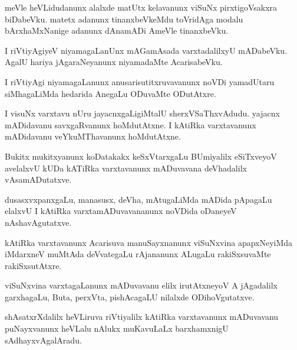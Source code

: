 \documentclass{article}
\begin{document}
\begin{mn}%
meVle heVLidudanunx alalxde matUtx kelavanunx viSuNx pirxtigoVsakxra biDabeVku. matetx adanunx 
tinanxbeVkeMdu toVridAga modalu bArxhaMxNanige adanunx dAnamADi AmeVle tinanxbeVku.
\end{mn}

\begin{mn}%
I riVtiyAgiyeV niyamagaLanUnx mAGamAsada varxtadalilxyU mADabeVku. AgalU hariya jAgaraNeyanunx 
niyamadaMte AcarisabeVku.
\end{mn}

\begin{mn}%
I riVtiyAgi niyamagaLanunx anusarisutitxruvavanunx noVDi yamadUtaru siMhagaLiMda hedarida AnegaLu 
ODuvaMte ODutAtxre.
\end{mn}

\begin{mn}%
I visuNx varxtavu nUru jayacnxgaLigiMtalU sherxVSaThxvAdudu. yajacnx mADidavanu savxgaRvanunx 
hoMdutAtxne. I kAtiRka varxtavanunx mADidavanu veYkuMThavanunx hoMdutAtxne.
\end{mn}

\begin{mn}%
Bukitx mukitxyanunx koDatakakx keSxVtarxgaLu BUmiyalilx eSiTxveyoV avelalxvU kUDa kATiRka 
varxtavanunx mADuvavana deVhadalilx vAsamADutatxve.
\end{mn}

\begin{mn}%
dusasxvxpanxgaLu, manasusx, deVha, mAtugaLiMda mADida pApagaLu elalxvU I kAtiRka 
varxtamADuvavananunx noVDida oDaneyeV nAshavAgutatxve.
\end{mn}

\begin{mn}%
kAtiRka varxtavanunx Acarisuva manuSayxnanunx viSuNxvina apapxNeyiMda iMdarxneV muMtAda deVvategaLu 
rAjananunx ALugaLu rakiSxsuvaMte rakiSxsutAtxre.
\end{mn}

\begin{mn}%
viSuNxvina varxtagaLanunx mADuvavanu elilx irutAtxneyoV A jAgadalilx garxhagaLu, Buta, perxVta, 
pishAcagaLU nilalxde ODihoVgutatxve.
\end{mn}

\begin{mn}%
shAsatxrXdalilx heVLiruva riVtiyalilx kAtiRka varxtavanunx mADuvavanu puNayxvanunx heVLalu nAlukx 
muKavuLaLx barxhamxnigU sAdhayxvAgalAradu.
\end{mn}
\end{document}
